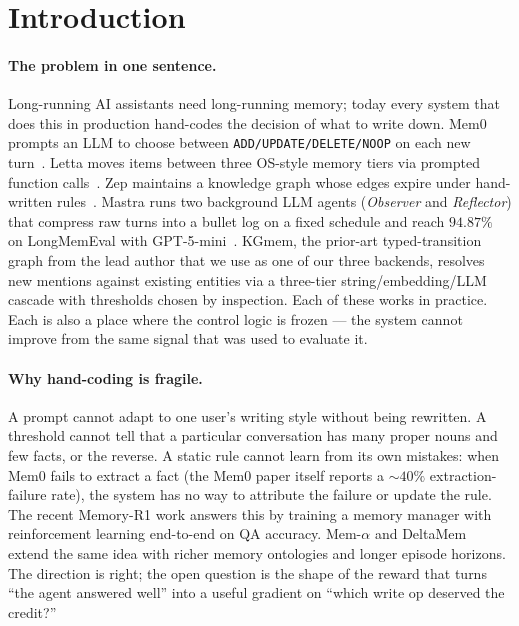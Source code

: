 \documentclass[11pt]{article}
\begin{document}
\section{Introduction}

\paragraph{The problem in one sentence.} Long-running AI assistants
need long-running memory; today every system that does this in
production hand-codes the decision of what to write down. Mem0 prompts
an LLM to choose between \texttt{ADD/UPDATE/DELETE/NOOP} on each new
turn~\cite{chhikara2024mem0}. Letta moves items between three OS-style
memory tiers via prompted function calls~\cite{zhang2024memgpt}. Zep
maintains a knowledge graph whose edges expire under hand-written
rules~\cite{rasmussen2024zep}. Mastra runs two background LLM agents
(\emph{Observer} and \emph{Reflector}) that compress raw turns into a
bullet log on a fixed schedule and reach $94.87\%$ on LongMemEval with
GPT-5-mini~\cite{mastra2025om}. KGmem, the prior-art typed-transition
graph from the lead author that we use as one of our three backends,
resolves new mentions against existing entities via a three-tier
string/embedding/LLM cascade with thresholds chosen by inspection.
Each of these works in practice. Each is also a place where the
control logic is frozen --- the system cannot improve from the same
signal that was used to evaluate it.

\paragraph{Why hand-coding is fragile.} A prompt cannot adapt to one
user's writing style without being rewritten. A threshold cannot tell
that a particular conversation has many proper nouns and few facts,
or the reverse. A static rule cannot learn from its own mistakes:
when Mem0 fails to extract a fact (the Mem0 paper itself reports a
$\sim 40\%$ extraction-failure rate), the system has no way to
attribute the failure or update the rule. The recent Memory-R1 work
\cite{memoryR1} answers this by training a memory manager with
reinforcement learning end-to-end on QA accuracy. Mem-$\alpha$
\cite{memalpha2025} and DeltaMem~\cite{deltamem2026} extend the same
idea with richer memory ontologies and longer episode horizons.
The direction is right; the open question is the shape of the reward
that turns ``the agent answered well'' into a useful gradient on
``which write op deserved the credit?''
\end{document}

